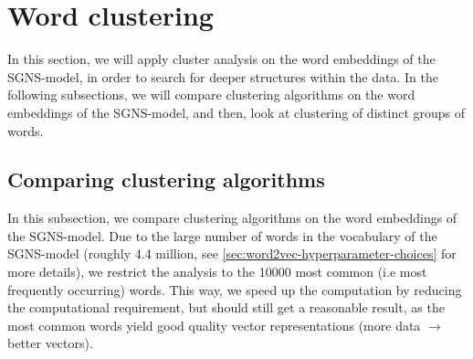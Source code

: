 \section{Word clustering}
\label{sec:analysis-of-word-embeddings-word-clustering}
In this section, we will apply cluster analysis on the word embeddings of the SGNS-model, in order to search for deeper structures within the data. In the following subsections, we will compare clustering algorithms on the word embeddings of the SGNS-model, and then, look at clustering of distinct groups of words.

\subsection{Comparing clustering algorithms}
\label{sec:comparing-clustering-algorithms}
In this subsection, we compare clustering algorithms on the word embeddings of the SGNS-model. Due to the large number of words in the vocabulary of the SGNS-model (roughly 4.4 million, see \cref{sec:word2vec-hyperparameter-choices} for more details), we restrict the analysis to the 10000 most common (i.e most frequently occurring) words. This way, we speed up the computation by reducing the computational requirement, but should still get a reasonable result, as the most common words yield good quality vector representations (more data $\rightarrow$ better vectors).


